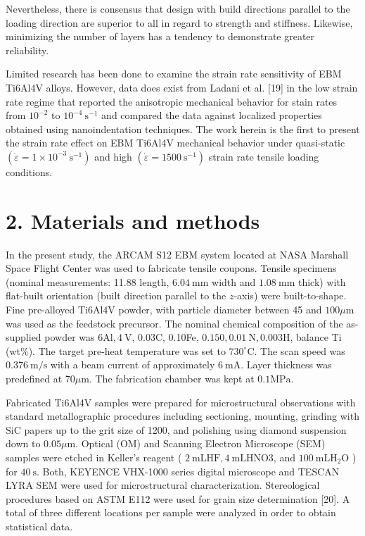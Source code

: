 \documentclass[10pt]{article}
\begin{document}
Nevertheless, there is consensus that design with build directions parallel to the loading direction are superior to all in regard to strength and stiffness. Likewise, minimizing the number of layers has a tendency to demonstrate greater reliability.

Limited research has been done to examine the strain rate sensitivity of EBM Ti6Al4V alloys. However, data does exist from Ladani et al. [19] in the low strain rate regime that reported the anisotropic mechanical behavior for stain rates from $10^{-2}$ to $10^{-4} \mathrm{~s}^{-1}$ and compared the data against localized properties obtained using nanoindentation techniques. The work herein is the first to present the strain rate effect on EBM Ti6Al4V mechanical behavior under quasi-static $\left(\dot{\varepsilon}=1 \times 10^{-3} \mathrm{~s}^{-1}\right)$ and high $\left(\dot{\varepsilon}=1500 \mathrm{~s}^{-1}\right)$ strain rate tensile loading conditions.

\section*{2. Materials and methods}
In the present study, the ARCAM S12 EBM system located at NASA Marshall Space Flight Center was used to fabricate tensile coupons. Tensile specimens (nominal measurements: 11.88 length, $6.04 \mathrm{~mm}$ width and $1.08 \mathrm{~mm}$ thick) with flat-built orientation (built direction parallel to the $z$-axis) were built-to-shape. Fine pre-alloyed Ti6Al4V powder, with particle diameter between 45 and $100 \mu \mathrm{m}$ was used as the feedstock precursor. The nominal chemical composition of the as-supplied powder was $6 \mathrm{Al}, 4 \mathrm{~V}$, 0.03C, 0.10Fe, $0.150,0.01 \mathrm{~N}, 0.003 \mathrm{H}$, balance Ti (wt\%). The target pre-heat temperature was set to $730^{\circ} \mathrm{C}$. The scan speed was $0.376 \mathrm{~m} / \mathrm{s}$ with a beam current of approximately $6 \mathrm{~mA}$. Layer thickness was predefined at $70 \mu \mathrm{m}$. The fabrication chamber was kept at $0.1 \mathrm{MPa}$.

Fabricated Ti6Al4V samples were prepared for microstructural observations with standard metallographic procedures including sectioning, mounting, grinding with $\mathrm{SiC}$ papers up to the grit size of 1200, and polishing using diamond suspension down to $0.05 \mu \mathrm{m}$. Optical (OM) and Scanning Electron Microscope (SEM) samples were etched in Keller's reagent ( $2 \mathrm{~mL} \mathrm{HF}, 4 \mathrm{~mL} \mathrm{HNO} 3$, and $100 \mathrm{~mL} \mathrm{H}_{2} \mathrm{O}$ ) for $40 \mathrm{~s}$. Both, KEYENCE VHX-1000 series digital microscope and TESCAN LYRA SEM were used for microstructural characterization. Stereological procedures based on ASTM E112 were used for grain size determination [20]. A total of three different locations per sample were analyzed in order to obtain statistical data.
\end{document}
